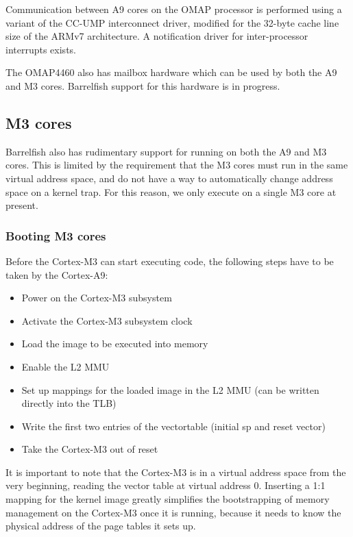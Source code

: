 \documentclass[a4paper,twoside]{report} %
\begin{document}
Communication between A9 cores on the OMAP processor is performed
using a variant of the CC-UMP interconnect driver, modified for the
32-byte cache line size of the ARMv7 architecture.  A notification
driver for inter-processor interrupts exists. 

The OMAP4460 also has mailbox hardware which can be used by both the
A9 and M3 cores.  Barrelfish support for this hardware is in
progress. 

\subsection{M3 cores}

Barrelfish also has rudimentary support for running on both the A9 and
M3 cores.  This is limited by the requirement that the M3 cores must
run in the same virtual address space, and do not have a way to
automatically change address space on a kernel trap.  For this reason,
we only execute on a single M3 core at present. 

\subsubsection{Booting M3 cores}

Before the Cortex-M3 can start executing code, the following steps
have to be taken by the Cortex-A9:

\begin{itemize}
\item Power on the Cortex-M3 subsystem
\item Activate the Cortex-M3 subsystem clock
\item Load the image to be executed into memory
\item Enable the L2 MMU
\item Set up mappings for the loaded image in the L2 MMU (can be
  written directly into the TLB)
\item Write the first two entries of the vectortable (initial sp and
  reset vector)
\item Take the Cortex-M3 out of reset
\end{itemize}

It is important to note that the Cortex-M3 is in a virtual address
space from the very beginning, reading the vector table at virtual
address 0. Inserting a 1:1 mapping for the kernel image greatly
simplifies the bootstrapping of memory management on the Cortex-M3
once it is running, because it needs to know the physical address of
the page tables it sets up.
\end{document}
